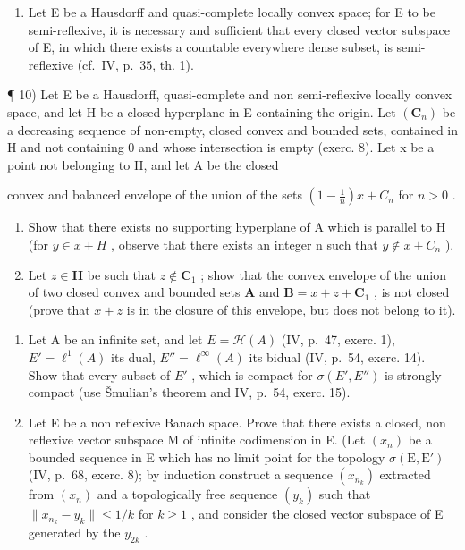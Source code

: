 \begin{enumerate}
\def\labelenumi{\arabic{enumi})}
\setcounter{enumi}{8}
\tightlist
\item
  Let E be a Hausdorff and quasi-complete locally convex space; for E to be semi-reflexive, it is necessary and sufficient that every closed vector subspace of E, in which there exists a countable everywhere dense subset, is semi-reflexive (cf.~IV, p.~35, th. 1).
\end{enumerate}

¶ 10) Let E be a Hausdorff, quasi-complete and non semi-reflexive locally convex space, and let H be a closed hyperplane in E containing the origin. Let \((\mathbf{C}_{n})\) be a decreasing sequence of non-empty, closed convex and bounded sets, contained in H and not containing 0 and whose intersection is empty (exerc. 8). Let x be a point not belonging to H, and let A be the closed

convex and balanced envelope of the union of the sets \(\left(1 - \frac{1}{n}\right)x + C_n\) for \(n > 0\) .

\begin{enumerate}
\def\labelenumi{\alph{enumi})}
\item
  Show that there exists no supporting hyperplane of A which is parallel to H (for \(y \in x + H\) , observe that there exists an integer n such that \(y \notin x + C_{n}\) ).
\item
  Let \(z \in \mathbf{H}\) be such that \(z \notin \mathbf{C}_1\) ; show that the convex envelope of the union of two closed convex and bounded sets \(\mathbf{A}\) and \(\mathbf{B} = x + z + \mathbf{C}_1\) , is not closed (prove that \(x + z\) is in the closure of this envelope, but does not belong to it).
\end{enumerate}

\begin{enumerate}
\def\labelenumi{\arabic{enumi})}
\setcounter{enumi}{10}
\item
  Let A be an infinite set, and let \(E = \overline{\mathcal{H}}(A)\) (IV, p.~47, exerc. 1), \(E' = \ell^{1}(A)\) its dual, \(E'' = \ell^{\infty}(A)\) its bidual (IV, p.~54, exerc. 14). Show that every subset of \(E'\) , which is compact for \(\sigma(E', E'')\) is strongly compact (use Šmulian's theorem and IV, p.~54, exerc. 15).
\item
  Let E be a non reflexive Banach space. Prove that there exists a closed, non reflexive vector subspace M of infinite codimension in E. (Let \((x_{n})\) be a bounded sequence in E which has no limit point for the topology \(\sigma(\mathrm{E},\mathrm{E}')\) (IV, p.~68, exerc. 8); by induction construct a sequence \((x_{n_{k}})\) extracted from \((x_{n})\) and a topologically free sequence \((y_{k})\) such that \(\| x_{n_{k}} - y_{k} \| \leqslant 1/k\) for \(k \geqslant 1\) , and consider the closed vector subspace of E generated by the \(y_{2k}\) .
\end{enumerate}

